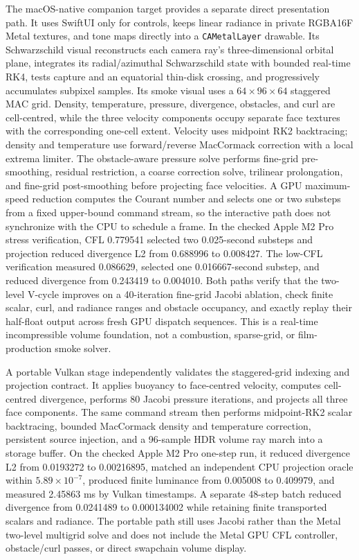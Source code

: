 \documentclass[10pt]{article}
\begin{document}
The macOS-native companion target provides a separate direct presentation path. It uses SwiftUI
only for controls, keeps linear radiance in private RGBA16F Metal textures, and tone maps directly
into a \texttt{CAMetalLayer} drawable. Its Schwarzschild visual reconstructs each camera ray's
three-dimensional orbital plane, integrates its radial/azimuthal Schwarzschild state with bounded
real-time RK4, tests capture and an equatorial thin-disk crossing, and progressively accumulates
subpixel samples. Its smoke visual uses a $64\times96\times64$ staggered MAC grid. Density,
temperature, pressure, divergence, obstacles, and curl are cell-centred, while the three velocity
components occupy separate face textures with the corresponding one-cell extent. Velocity uses
midpoint RK2 backtracing; density and temperature use forward/reverse MacCormack correction with a
local extrema limiter. The obstacle-aware pressure solve performs fine-grid pre-smoothing,
residual restriction, a coarse correction solve, trilinear prolongation, and fine-grid
post-smoothing before projecting face velocities. A GPU maximum-speed reduction computes the
Courant number and selects one or two substeps from a fixed upper-bound command stream, so the
interactive path does not synchronize with the CPU to schedule a frame. In the checked Apple M2
Pro stress verification, CFL 0.779541 selected two 0.025-second substeps and projection reduced
divergence L2 from 0.688996 to 0.008427. The low-CFL verification measured 0.086629, selected one
0.016667-second substep, and reduced divergence from 0.243419 to 0.004010. Both paths verify that
the two-level V-cycle improves on a 40-iteration fine-grid Jacobi ablation, check finite scalar,
curl, and radiance ranges and obstacle occupancy, and exactly replay their half-float output across
fresh GPU dispatch sequences. This is a real-time incompressible volume foundation, not a combustion,
sparse-grid, or film-production smoke solver.

A portable Vulkan stage independently validates the staggered-grid indexing and projection
contract. It applies buoyancy to face-centred velocity, computes cell-centred divergence, performs
80 Jacobi pressure iterations, and projects all three face components. The same command stream then
performs midpoint-RK2 scalar backtracing, bounded MacCormack density and temperature correction,
persistent source injection, and a 96-sample HDR volume ray march into a storage buffer. On the
checked Apple M2 Pro one-step run, it reduced divergence L2 from 0.0193272 to 0.00216895, matched an
independent CPU projection oracle within $5.89\times10^{-7}$, produced finite luminance from
0.005008 to 0.409979, and measured 2.45863 ms by Vulkan timestamps. A separate 48-step batch reduced
divergence from 0.0241489 to 0.000134002 while retaining finite transported scalars and radiance.
The portable path still uses Jacobi rather than the Metal two-level multigrid solve and does not
include the Metal GPU CFL controller, obstacle/curl passes, or direct swapchain volume display.
\end{document}
